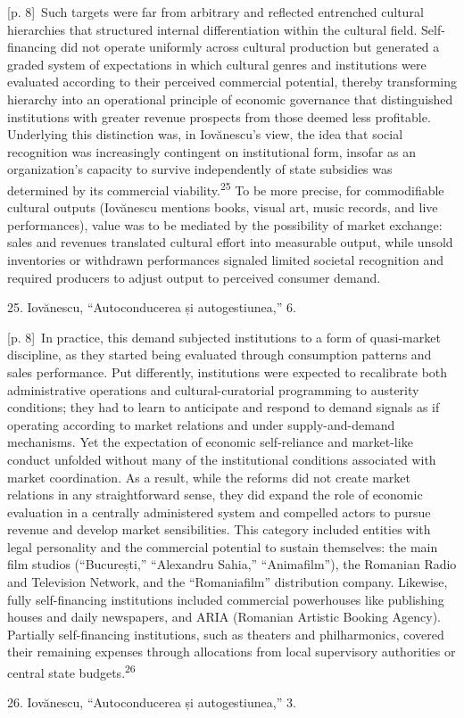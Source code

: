 \documentclass[10pt,a4paper]{article}
\begin{document}
{\scriptsize\color{gray} [p. 8]}\ Such targets were far from arbitrary and reflected entrenched cultural hierarchies that structured internal differentiation within the cultural field. Self-financing did not operate uniformly across cultural production but generated a graded system of expectations in which cultural genres and institutions were evaluated according to their perceived commercial potential, thereby transforming hierarchy into an operational principle of economic governance that distinguished institutions with greater revenue prospects from those deemed less profitable. Underlying this distinction was, in Iovănescu’s view, the idea that social recognition was increasingly contingent on institutional form, insofar as an organization’s capacity to survive independently of state subsidies was determined by its commercial viability.\nobreak\textsuperscript{25} To be more precise, for commodifiable cultural outputs (Iovănescu mentions books, visual art, music records, and live performances), value was to be mediated by the possibility of market exchange: sales and revenues translated cultural effort into measurable output, while unsold inventories or withdrawn performances signaled limited societal recognition and required producers to adjust output to perceived consumer demand.\par{\small 25. Iovănescu, “Autoconducerea și autogestiunea,” 6.\par}
{\scriptsize\color{gray} [p. 8]}\ In practice, this demand subjected institutions to a form of quasi-market discipline, as they started being evaluated through consumption patterns and sales performance. Put differently, institutions were expected to recalibrate both administrative operations and cultural-curatorial programming to austerity conditions; they had to learn to anticipate and respond to demand signals as if operating according to market relations and under supply-and-demand mechanisms. Yet the expectation of economic self-reliance and market-like conduct unfolded without many of the institutional conditions associated with market coordination. As a result, while the reforms did not create market relations in any straightforward sense, they did expand the role of economic evaluation in a centrally administered system and compelled actors to pursue revenue and develop market sensibilities. This category included entities with legal personality and the commercial potential to sustain themselves: the main film studios (“București,” “Alexandru Sahia,” “Animafilm”), the Romanian Radio and Television Network, and the “Romaniafilm” distribution company. Likewise, fully self-financing institutions included commercial powerhouses like publishing houses and daily newspapers, and ARIA (Romanian Artistic Booking Agency). Partially self-financing institutions, such as theaters and philharmonics, covered their remaining expenses through allocations from local supervisory authorities or central state budgets.\nobreak\textsuperscript{26}\par{\small 26. Iovănescu, “Autoconducerea și autogestiunea,” 3.\par}
\end{document}
